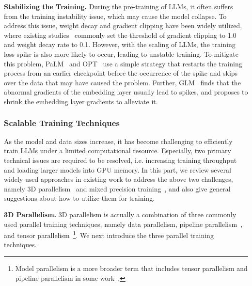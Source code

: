 \textbf{Stabilizing the Training.} During the pre-training of LLMs, it often suffers from the  training instability issue, which may cause the model collapse. To address this issue, weight decay and gradient clipping have been widely utilized, where existing studies~\cite{Brown-NeurIPS-2020-Language,Zhang-arxiv-2022-OPT,Scao-arxiv-2022-BLOOM,Smith-CoRR-2022-Using,Zeng-arxiv-2022-GLM}  commonly set the threshold of gradient clipping to 1.0 and weight decay rate to 0.1. However, with the scaling of LLMs, the training loss spike is also more likely to occur, leading to  unstable training. To mitigate this problem, PaLM~\cite{Chowdhery-arxiv-2022-PaLM} and OPT~\cite{Zhang-arxiv-2022-OPT} use a simple strategy that restarts the training process from an earlier checkpoint before the occurrence of the spike and skips over the data that may have caused the problem. Further, GLM~\cite{Zeng-arxiv-2022-GLM} finds that the abnormal gradients of the embedding layer usually lead to spikes, and proposes  to shrink the embedding layer gradients to alleviate it.

\subsubsection{Scalable Training Techniques} \label{subsub:scalable}
As  the model and data sizes increase, it has become challenging to efficiently train LLMs under a limited computational resource. Especially, two primary technical issues are required to be resolved, i.e. increasing training throughput and loading larger models into GPU memory. In this part, we review several widely used approaches in existing work to address the above two challenges, namely 3D parallelism~\cite{Huang-NeurIPS-2019-GPipe,Harlap-arXiv-2018-PipeDream,Shoeybi-arXiv-2019-Megatron} and mixed precision training~\cite{Micikevicius-arXiv-2017-Mixed}, and also give general suggestions about how to utilize them for training. 

\textbf{3D Parallelism.} {3D parallelism is actually a combination of three commonly used parallel training techniques, namely data parallelism, pipeline parallelism~\cite{Huang-NeurIPS-2019-GPipe,Harlap-arXiv-2018-PipeDream}, and tensor parallelism~\cite{Shoeybi-arXiv-2019-Megatron}\footnote{Model parallelism is a more broader term that includes tensor parallelism and pipeline parallelism in some work~\cite{Shoeybi-arXiv-2019-Megatron}.}.} We next introduce the three parallel training techniques. 

